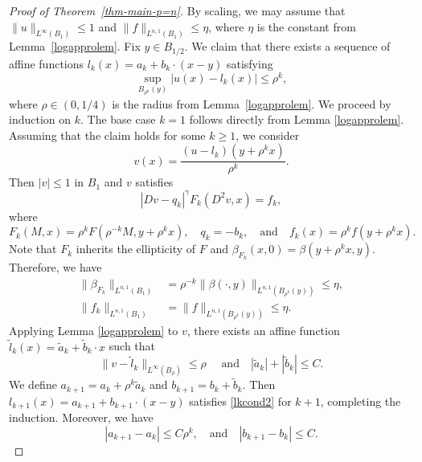 \documentclass[11pt]{amsart}
\theoremstyle{plain}
\theoremstyle{definition}
\numberwithin{equation}{section}
\begin{document}
\begin{proof}[Proof of Theorem~\ref{thm-main-p=n}]
By scaling, we may assume that $\|u\|_{L^\infty(B_1)} \leq 1$ and $\|f\|_{L^{n,1}(B_1)}\leq \eta$, where $\eta$ is the constant from Lemma~\ref{logapprolem}.  
Fix $y \in B_{1/2}$.
We claim that there exists a sequence of affine functions $l_k(x)=a_k+b_k\cdot (x-y)$ satisfying
\begin{equation} \label{lkcond2}
    \sup_{B_{\rho^k}(y)}|u(x)-l_k(x)| \leq \rho^k,
\end{equation}
where $\rho\in(0,1/4)$ is the radius from Lemma~\ref{logapprolem}.
We proceed by induction on $k$.
The base case $k=1$ follows directly from Lemma \ref{logapprolem}.
Assuming that the claim holds for some $k\geq1$, we consider
\begin{equation*}
    v(x)=\frac{(u-l_k)(y+\rho^kx)}{\rho^k}.
\end{equation*}
Then $|v| \leq 1$ in $B_1$ and $v$ satisfies 
\begin{equation*}
    |Dv-q_k|^\gamma F_k(D^2v,x) = f_k,
\end{equation*}
where
\begin{equation*}
    F_k(M,x) = \rho^kF(\rho^{-k}M, y+\rho^kx), \quad q_k =-b_k, \quad \text{and} \quad f_k(x) = \rho^kf(y+\rho^kx).
\end{equation*}
Note that $F_k$ inherits the ellipticity of $F$ and $\beta_{F_k}(x, 0) = \beta(y+\rho^kx,y)$.
Therefore, we have
\begin{equation*}
\begin{aligned}
    \|\beta_{F_k}\|_{L^{n,1}(B_1)} &= \rho^{-k}\|\beta(\cdot, y)\|_{L^{n,1}(B_{\rho^k}(y))} \leq \eta,\\
    \|f_k\|_{L^{n,1}(B_1)} &= \|f\|_{L^{n,1}(B_{\rho^k}(y))} \leq \eta.
\end{aligned}
\end{equation*}
Applying Lemma \ref{logapprolem} to $v$, there exists an affine function $\tilde{l}_k(x) =\tilde{a}_k+ \tilde{b}_k\cdot x$ such that 
\begin{equation*}
     \|v-\tilde{l}_k\|_{L^\infty(B_\rho)} \leq \rho \quad  \text{ and} \quad |\tilde{a}_k|+|\tilde{b}_k| \leq C.
\end{equation*}
We define $a_{k+1} = a_k + \rho^k\tilde{a}_k$ and $b_{k+1} = b_k + \tilde{b}_k$. Then $l_{k+1}(x) = a_{k+1} + b_{k+1} \cdot (x - y)$ satisfies \eqref{lkcond2} for $k+1$, completing the induction.
Moreover, we have
\begin{equation} \label{abcond}
    |a_{k+1}-a_k| \leq C\rho^k, \quad \text{and} \quad |b_{k+1}-b_k| \leq C.

\end{equation}
\end{proof}
\end{document}
